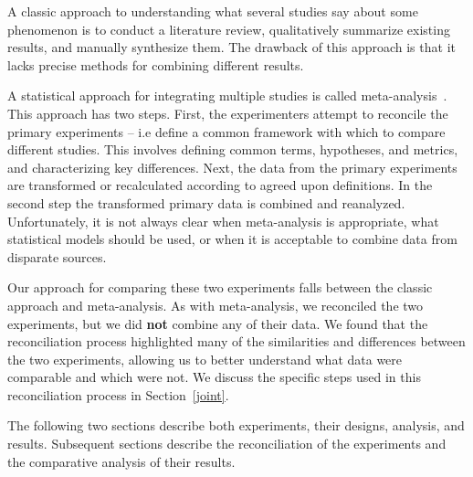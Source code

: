 A classic approach to understanding what several studies say about 
some phenomenon is to conduct a literature review, qualitatively 
summarize existing results, and manually synthesize them. The drawback 
of this approach is that it lacks precise methods for combining 
different results. 

A statistical approach for integrating multiple studies is called 
meta-analysis~\cite{glass}. This approach has two steps. First, the 
experimenters attempt to reconcile the primary experiments -- i.e define 
a common framework with which to compare different studies.  This involves
defining common terms, hypotheses, and metrics, and characterizing key 
differences.  Next, the data from the primary experiments are transformed 
or recalculated according to agreed upon definitions. In the second step
the transformed primary data is combined and reanalyzed.
Unfortunately, it is not always clear when meta-analysis is appropriate,  
what statistical models should be used, or when it is acceptable to 
combine data from disparate sources. 

Our approach for comparing these two experiments falls between the classic 
approach and meta-analysis.  As with meta-analysis, we reconciled the two 
experiments, but we did {\bf not} combine any of their data.  We found 
that the reconciliation process highlighted many of the similarities 
and differences between the two experiments, allowing us to better 
understand what data were comparable and which were not. We discuss the 
specific steps used in this reconciliation process in Section~\ref{joint}.

The following two sections describe both experiments, 
their designs, analysis, and results. Subsequent sections
describe the reconciliation of the experiments and the  
comparative analysis of their results.
